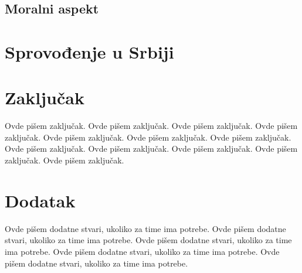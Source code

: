 \documentclass[a4paper]{article}
\begin{document}
\subsection{Moralni aspekt}
\label{subsec:morala_sam}

\section{Sprovođenje u Srbiji}
\label{sec:srb}

\section{Zaključak}
\label{sec:zakljucak}

Ovde pišem zaključak. 
Ovde pišem zaključak. 
Ovde pišem zaključak. 
Ovde pišem zaključak. 
Ovde pišem zaključak. 
Ovde pišem zaključak. 
Ovde pišem zaključak. 
Ovde pišem zaključak. 
Ovde pišem zaključak. 
Ovde pišem zaključak. 
Ovde pišem zaključak. 
Ovde pišem zaključak. 


\appendix
 


\appendix
\section{Dodatak}
Ovde pišem dodatne stvari, ukoliko za time ima potrebe.
Ovde pišem dodatne stvari, ukoliko za time ima potrebe.
Ovde pišem dodatne stvari, ukoliko za time ima potrebe.
Ovde pišem dodatne stvari, ukoliko za time ima potrebe.
Ovde pišem dodatne stvari, ukoliko za time ima potrebe.
\end{document}
